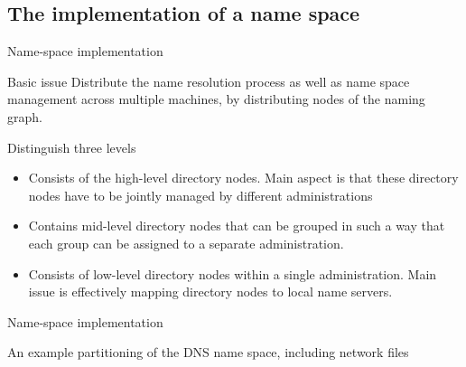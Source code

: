 \subsection{The implementation of a name space}
\begin{slide}{Name-space implementation}
  \begin{block}{Basic issue} 
    Distribute the name resolution process as well as name space management across multiple machines, by
    distributing nodes of the naming graph.
  \end{block}
  \begin{block}{Distinguish three levels}
    \begin{itemize}\tightlist
    \item<3->  Consists of the high-level directory nodes. Main aspect is that these directory
      nodes have to be jointly managed by different administrations
    \item<4->  Contains mid-level directory nodes that can be grouped in such a way
      that each group can be assigned to a separate administration.
    \item<5->  Consists of low-level directory nodes within a single administration. Main
      issue is effectively mapping directory nodes to local name servers.
    \end{itemize}
  \end{block}
\end{slide}
\begin{slide}{Name-space implementation}
  \vspace*{-6pt}
  \begin{block}{An example partitioning of the DNS name space, including network files}
    \begin{center}
    \end{center}
  \end{block}
\end{slide}
